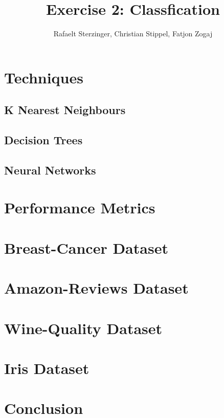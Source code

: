 \documentclass{article}
\title{Exercise 2: Classfication}
\author{Rafaelt Sterzinger, Christian Stippel, Fatjon Zogaj}
\begin{document}
\maketitle

\section{Techniques}

\subsection{K Nearest Neighbours}

\subsection{Decision Trees}

\subsection{Neural Networks}

\section{Performance Metrics}

\section{Breast-Cancer Dataset}


\section{Amazon-Reviews Dataset}


\section{Wine-Quality Dataset}


\section{Iris Dataset}


\section{Conclusion}
\end{document}
